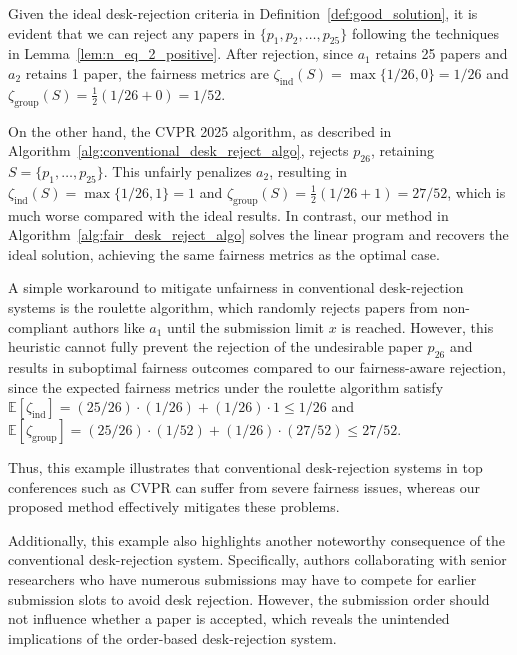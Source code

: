 Given the ideal desk-rejection criteria in Definition~\ref{def:good_solution}, it is evident that we can reject any papers in $\{p_1, p_2, \ldots, p_{25}\}$ following the techniques in Lemma~\ref{lem:n_eq_2_positive}. After rejection, since $a_1$ retains 25 papers and $a_2$ retains 1 paper, the fairness metrics are $\zeta_{\mathrm{ind}}(S) = \max\{1/26, 0\} = 1/26$ and $\zeta_{\mathrm{group}}(S) = \frac{1}{2}(1/26 + 0) = 1/52$.

On the other hand, the CVPR 2025 algorithm, as described in Algorithm~\ref{alg:conventional_desk_reject_algo}, rejects $p_{26}$, retaining $S = \{p_1, \ldots, p_{25}\}$. This unfairly penalizes $a_2$, resulting in $\zeta_{\mathrm{ind}}(S) = \max\{1/26, 1\}= 1$ and $\zeta_{\mathrm{group}}(S) = \frac{1}{2}(1/26 + 1) = 27/52$,
which is much worse compared with the ideal results. In contrast, our method in Algorithm~\ref{alg:fair_desk_reject_algo} solves the linear program and recovers the ideal solution, achieving the same fairness metrics as the optimal case.

A simple workaround to mitigate unfairness in conventional desk-rejection systems is the roulette algorithm, which randomly rejects papers from non-compliant authors like $a_1$ until the submission limit $x$ is reached. However, this heuristic cannot fully prevent the rejection of the undesirable paper $p_{26}$ and results in suboptimal fairness outcomes compared to our fairness-aware rejection, since the expected fairness metrics under the roulette algorithm satisfy $\mathbb{E}[\zeta_{\mathrm{ind}}] = (25/26) \cdot(1/26) + (1/26) \cdot 1 \leq 1/26$ and $\mathbb{E}[\zeta_{\mathrm{group}}] = (25/26) \cdot (1/52) + (1/26) \cdot (27/52) \leq 27/52$.

Thus, this example illustrates that conventional desk-rejection systems in top conferences such as CVPR can suffer from severe fairness issues, whereas our proposed method effectively mitigates these problems. 

Additionally, this example also highlights another noteworthy consequence of the conventional desk-rejection system. Specifically, authors collaborating with senior researchers who have numerous submissions may have to compete for earlier submission slots to avoid desk rejection. However, the submission order should not influence whether a paper is accepted, which reveals the unintended implications of the order-based desk-rejection system.

